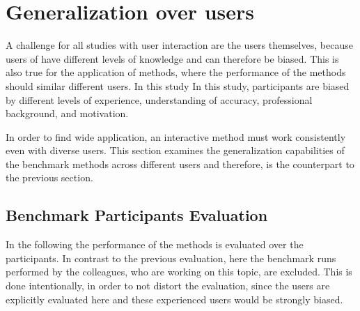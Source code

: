 
\section{Generalization over users}\label{ord:ch5:sec_3_generalization_user}

A challenge for all studies with user interaction are the users themselves, because users of have different levels of knowledge and can therefore be biased.
This is also true for the application of methods, where the performance of the methods should similar different users.
In this study 
In this study, participants are biased by different levels of experience, understanding of accuracy, professional background, and motivation.

In order to find wide application, an interactive method must work consistently even with diverse users.
This section examines the generalization capabilities of the benchmark methods across different users and therefore, is the counterpart to the previous section.




\subsection{Benchmark Participants Evaluation}\label{ord:ch5:sec3:subsec1}

In the following the performance of the methods is evaluated over the \getNumberBenchmarkParticipants \space participants.
In contrast to the previous evaluation, here the benchmark runs performed by the colleagues, who are working on this topic, are excluded.
This is done intentionally, in order to not distort the evaluation, since the users are explicitly evaluated here and these experienced users would be strongly biased.

